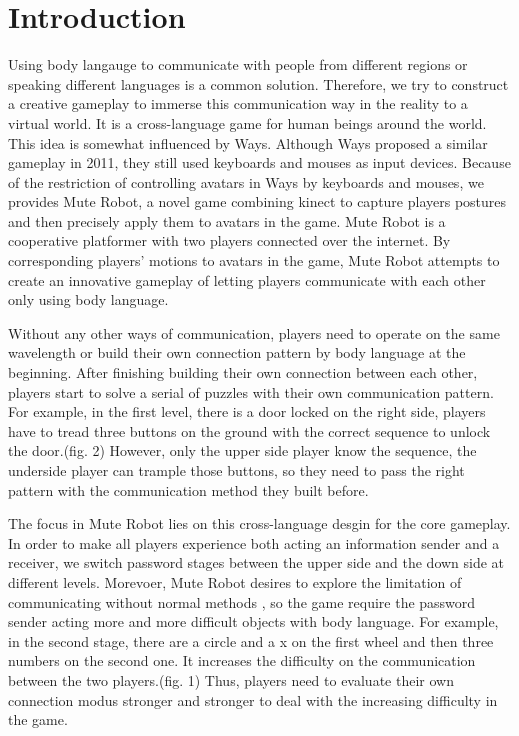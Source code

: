 \documentclass{chi-ext}
\begin{document}
\section{Introduction}
Using body langauge to communicate with people from different regions or speaking different languages is a common solution. 
Therefore, we try to construct a creative gameplay to immerse this communication way in the reality to a virtual world.
It is a cross-language game for human beings around the world. 
This idea is somewhat influenced by Ways\cite{Ways}. Although Ways proposed a similar gameplay in 2011, they still used keyboards and mouses as input devices.
Because of the restriction of controlling avatars in Ways by keyboards and mouses, we provides Mute Robot, a novel game combining kinect to capture players postures and then precisely apply them to avatars in the game.
Mute Robot is a cooperative platformer with two players connected over the internet.
By corresponding players' motions to avatars in the game, Mute Robot attempts to create an innovative gameplay of letting players communicate with each other only using body language.


Without any other ways of communication, players need to operate on the same wavelength or build their own connection pattern by body language at the beginning.
After finishing building their own connection between each other, players start to solve a serial of puzzles with their own communication pattern.
For example, in the first level, there is a door locked on the right side, players have to tread three buttons on the ground with the correct sequence to unlock the door.(fig. 2)
However, only the upper side player know the sequence, the underside player can trample those buttons, so they need to pass the right pattern with the communication method they built before.

The focus in Mute Robot lies on this cross-language desgin for the core gameplay.
In order to make all players experience both acting an information sender and a receiver, we switch password stages between the upper side and the down side at different levels.
Morevoer, Mute Robot desires to explore the limitation of communicating without normal methods , so the game require the password sender acting more and more difficult objects with body language.
For example, in the second stage, there are a circle and a x on the first wheel and then three numbers on the second one. It increases the difficulty on the communication between the two players.(fig. 1)
Thus, players need to evaluate their own connection modus stronger and stronger to deal with the increasing difficulty in the game. 
\end{document}
